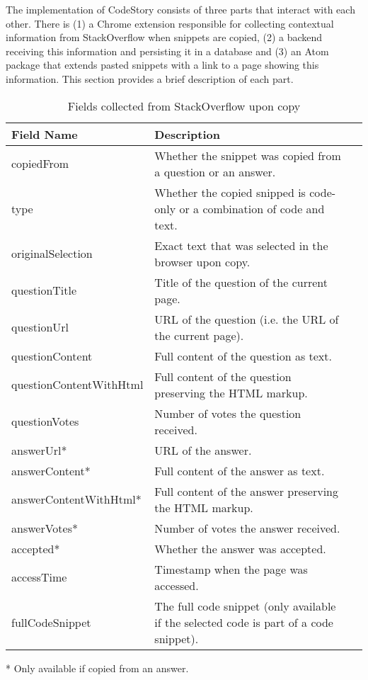 \documentclass[../manifest.tex]{subfiles}
\begin{document}
The implementation of CodeStory consists of three parts that interact with each
other. There is (1) a Chrome extension responsible for collecting contextual
information from StackOverflow when snippets are copied, (2) a backend receiving
this information and persisting it in a database and (3) an Atom package that
extends pasted snippets with a link to a page showing this information. This
section provides a brief description of each part.

\begin{table*}[t]
    \caption{Fields collected from StackOverflow upon copy}
    \label{tab:chrome-extension-fields}
    \centering
    \begin{threeparttable}
    \begin{tabular*}{\textwidth}{lll}
    \hline
    \textbf{Field Name} & \textbf{Description} \\
    \hline
    copiedFrom 					& Whether the snippet was copied from a question or an answer.\\
    type 						& Whether the copied snipped is code-only or a combination of code and text.\\
    originalSelection 			& Exact text that was selected in the browser upon copy.\\
    questionTitle 				& Title of the question of the current page.\\
    questionUrl      			& URL of the question (i.e. the URL of the current page).\\
    questionContent     		& Full content of the question as text.\\
    questionContentWithHtml     & Full content of the question preserving the HTML markup.\\
    questionVotes				& Number of votes the question received.\\
    answerUrl* 					& URL of the answer.\\
    answerContent*    			& Full content of the answer as text.\\
    answerContentWithHtml*		& Full content of the answer preserving the HTML markup.\\
    answerVotes*    			& Number of votes the answer received.\\
    accepted*					& Whether the answer was accepted.\\
    accessTime    				& Timestamp when the page was accessed.\\
    fullCodeSnippet    			& The full code snippet (only available if the selected code is part of a code snippet).\\
    \hline
    \end{tabular*}
    \begin{tablenotes}\footnotesize
        \item [*] Only available if copied from an answer.
    \end{tablenotes}
    \end{threeparttable}
\end{table*}
\end{document}
